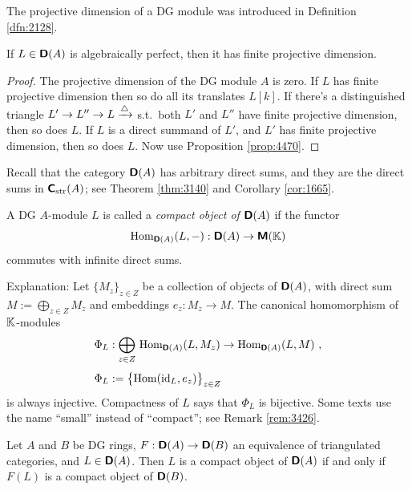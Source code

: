 The projective dimension of a DG module was introduced in Definition 
\ref{dfn:2128}.

\begin{prop} \label{prop:3415}
If $L \in \boldsymbol{\mathsf{D}}(A)$ is algebraically perfect, then it has finite projective 
dimension.
\end{prop}

\begin{proof}
The projective dimension of the DG module $A$ is zero. If $L$ has finite 
projective dimension then so do all its translates $L[k]$. 
If there's a distinguished triangle 
$L' \to L'' \to L \xrightarrow{\triangle}$
s.t.\ both $L'$ and $L''$ have finite projective dimension, then so does $L$. 
If $L$ is a direct summand of $L'$, and  $L'$ has finite projective 
dimension, then so does $L$.
Now use Proposition \ref{prop:4470}.
\end{proof}


Recall that the category $\boldsymbol{\mathsf{D}}(A)$ has arbitrary direct sums, and they are 
the direct sums in $\boldsymbol{\mathsf{C}}_{\mathrm{str}}(A)$; see Theorem \ref{thm:3140} and 
Corollary \ref{cor:1665}. 

\begin{dfn} \label{dfn:3405}
A DG $A$-module $L$ is called a {\em compact object of $\boldsymbol{\mathsf{D}}(A)$}
if the functor  
\[ \operatorname{Hom}_{\boldsymbol{\mathsf{D}}(A)}(L, -) : \boldsymbol{\mathsf{D}}(A) \to \boldsymbol{\mathsf{M}}(\mathbb{K}) \]
commutes with infinite direct sums. 
\end{dfn}

Explanation: Let $\{ M_z \}_{z \in Z}$ be a collection of objects of 
$\boldsymbol{\mathsf{D}}(A)$, with direct sum 
$M := \bigoplus_{z \in Z} M_z$ and embeddings 
$e_z : M_z \to M$. The canonical homomorphism of $\mathbb{K}$-modules 
\begin{equation} \label{eqn:3480}
\begin{aligned}
& \Phi_L : 
\bigoplus_{z \in Z} \, \operatorname{Hom}_{\boldsymbol{\mathsf{D}}(A)}(L, M_z) \to
\operatorname{Hom}_{\boldsymbol{\mathsf{D}}(A)} (L, M) \ ,
\\[0.4em]
& \Phi_L := \bigl\{ \operatorname{Hom}(\operatorname{id}_L, e_z) \bigr\}_{z \in Z}
\end{aligned}
\end{equation}
is always injective. Compactness of $L$ says that $\Phi_L$ is bijective.  
Some texts use the name ``small'' instead of ``compact''; see Remark 
\ref{rem:3426}.  

\begin{prop} \label{prop:3545}
Let $A$ and $B$ be DG rings, $F : \boldsymbol{\mathsf{D}}(A) \to \boldsymbol{\mathsf{D}}(B)$ an 
equivalence of triangulated categories, and $L \in \boldsymbol{\mathsf{D}}(A)$. Then $L$ is a 
compact object of $\boldsymbol{\mathsf{D}}(A)$ if and only if $F(L)$ is a 
compact object of $\boldsymbol{\mathsf{D}}(B)$.  
\end{prop}

